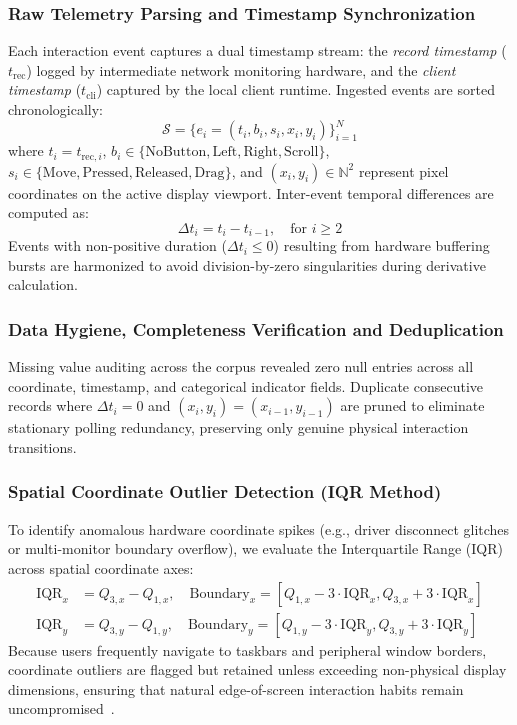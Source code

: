 \documentclass[10pt,journal,compsoc]{IEEEtran}
\begin{document}
\subsubsection{Raw Telemetry Parsing and Timestamp Synchronization}
Each interaction event captures a dual timestamp stream: the \textit{record timestamp} ($t_{\text{rec}}$) logged by intermediate network monitoring hardware, and the \textit{client timestamp} ($t_{\text{cli}}$) captured by the local client runtime. Ingested events are sorted chronologically:
\begin{equation}
\mathcal{S} = \{ e_i = (t_i, b_i, s_i, x_i, y_i) \}_{i=1}^{N}
\end{equation}
where $t_i = t_{\text{rec}, i}$, $b_i \in \{\text{NoButton}, \text{Left}, \text{Right}, \text{Scroll}\}$, $s_i \in \{\text{Move}, \text{Pressed}, \text{Released}, \text{Drag}\}$, and $(x_i, y_i) \in \mathbb{N}^2$ represent pixel coordinates on the active display viewport. Inter-event temporal differences are computed as:
\begin{equation}
\Delta t_i = t_i - t_{i-1}, \quad \text{for } i \ge 2
\end{equation}
Events with non-positive duration ($\Delta t_i \le 0$) resulting from hardware buffering bursts are harmonized to avoid division-by-zero singularities during derivative calculation.

\subsubsection{Data Hygiene, Completeness Verification and Deduplication}
Missing value auditing across the corpus revealed zero null entries across all coordinate, timestamp, and categorical indicator fields. Duplicate consecutive records where $\Delta t_i = 0$ and $(x_i, y_i) = (x_{i-1}, y_{i-1})$ are pruned to eliminate stationary polling redundancy, preserving only genuine physical interaction transitions.

\subsubsection{Spatial Coordinate Outlier Detection (IQR Method)}
To identify anomalous hardware coordinate spikes (e.g., driver disconnect glitches or multi-monitor boundary overflow), we evaluate the Interquartile Range (IQR) across spatial coordinate axes:
\begin{align}
\text{IQR}_x &= Q_{3,x} - Q_{1,x}, \quad \text{Boundary}_x = [Q_{1,x} - 3\cdot\text{IQR}_x, Q_{3,x} + 3\cdot\text{IQR}_x] \\
\text{IQR}_y &= Q_{3,y} - Q_{1,y}, \quad \text{Boundary}_y = [Q_{1,y} - 3\cdot\text{IQR}_y, Q_{3,y} + 3\cdot\text{IQR}_y]
\end{align}
Because users frequently navigate to taskbars and peripheral window borders, coordinate outliers are flagged but retained unless exceeding non-physical display dimensions, ensuring that natural edge-of-screen interaction habits remain uncompromised~\cite{naser2023impact}.
\end{document}
